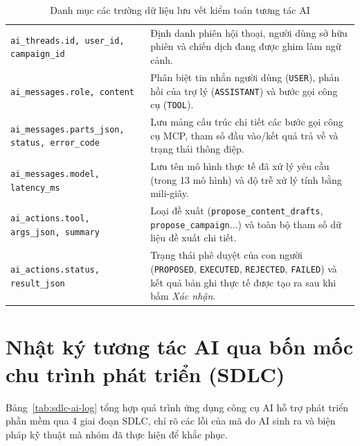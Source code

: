 \begin{table}[!htbp]
\centering
\scriptsize
\renewcommand{\arraystretch}{0.96}
\caption{Danh mục các trường dữ liệu lưu vết kiểm toán tương tác AI}\label{tab:audit-fields}
\begin{tabularx}{\textwidth}{|L{4.2cm}|Y|}
\hline
{} & \\
\hline
\texttt{ai\_threads.id, user\_id, campaign\_id} & Định danh phiên hội thoại, người dùng sở hữu phiên và chiến dịch đang được ghim làm ngữ cảnh.\\
\hline
\texttt{ai\_messages.role, content} & Phân biệt tin nhắn người dùng (\texttt{USER}), phản hồi của trợ lý (\texttt{ASSISTANT}) và bước gọi công cụ (\texttt{TOOL}).\\
\hline
\texttt{ai\_messages.parts\_json, status, error\_code} & Lưu mảng cấu trúc chi tiết các bước gọi công cụ MCP, tham số đầu vào/kết quả trả về và trạng thái thông điệp.\\
\hline
\texttt{ai\_messages.model, latency\_ms} & Lưu tên mô hình thực tế đã xử lý yêu cầu (trong 13 mô hình) và độ trễ xử lý tính bằng mili-giây.\\
\hline
\texttt{ai\_actions.tool, args\_json, summary} & Loại đề xuất (\texttt{propose\_content\_drafts}, \texttt{propose\_campaign}...) và toàn bộ tham số dữ liệu đề xuất chi tiết.\\
\hline
\texttt{ai\_actions.status, result\_json} & Trạng thái phê duyệt của con người (\texttt{PROPOSED}, \texttt{EXECUTED}, \texttt{REJECTED}, \texttt{FAILED}) và kết quả bản ghi thực tế được tạo ra sau khi bấm \textit{Xác nhận}.\\
\hline
\end{tabularx}
\end{table}

\section{Nhật ký tương tác AI qua bốn mốc chu trình phát triển (SDLC)}\label{sec:sdlc-ai-log}

Bảng~\ref{tab:sdlc-ai-log} tổng hợp quá trình ứng dụng công cụ AI hỗ trợ phát triển phần mềm qua 4 giai đoạn SDLC, chỉ rõ các lỗi của mã do AI sinh ra và biện pháp kỹ thuật mà nhóm đã thực hiện để khắc phục.

